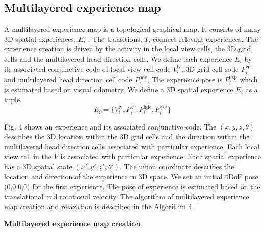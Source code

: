 \subsection{Multilayered experience map}

A multilayered experience map is a topological graphical map. 
It consists of many 3D spatial experiences, $E_i$ . 
The transitions, $T$, connect relevant experiences. 
The experience creation is driven by the activity in the local view cells, the 3D grid cells and the multilayered head direction cells. 
We define each experience $E_i$ by its associated conjunctive code of local view cell code $V_i^{\text{lv}}$, 3D grid cell code $P_i^{\text{gc}}$ and multilayered head direction cell code $P_i^{\text{hdc}}$. 
The experience pose is $P_i^{\text{exp}}$ which is estimated based on visual odometry. 
We define a 3D spatial experience $E_i$ as a tuple.
\begin{equation}
	E_i = 
		\{
			V_i^{\text{lv}},
			P_i^{\text{gc}},
			P_i^{\text{hdc}},
			P_i^{\text{exp}}
		\}
\end{equation}

Fig. 4 shows an experience and its associated conjunctive code. 
The $(x, y, z, \theta)$ describes the 3D location within the 3D grid cells and the direction within the multilayered head direction cells associated with particular experience. 
Each local view cell in the $V$ is associated with particular experience. 
Each spatial experience has a 3D spatial state $(x', y', z', \theta')$. 
The union coordinate describes the location and direction of the experience in 3D space. 
We set an initial 4DoF pose (0,0,0,0) for the first experience. 
The pose of experience is estimated based on the translational and rotational velocity. 
The algorithm of multilayered experience map creation and relaxation is described in the Algorithm 4.

\textbf{Multilayered experience map creation}

